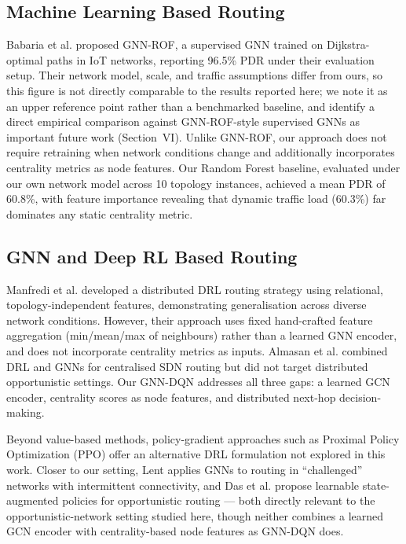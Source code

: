 \documentclass[conference]{IEEEtran}
\begin{document}
\subsection{Machine Learning Based Routing}
Babaria et al. \cite{babaria2025} proposed GNN-ROF, a supervised
GNN trained on Dijkstra-optimal paths in IoT networks, reporting
96.5\% PDR under their evaluation setup. Their network model,
scale, and traffic assumptions differ from ours, so this figure is
not directly comparable to the results reported here; we note it
as an upper reference point rather than a benchmarked baseline,
and identify a direct empirical comparison against GNN-ROF-style
supervised GNNs as important future work (Section~VI). Unlike
GNN-ROF, our approach does not require retraining when network
conditions change and additionally incorporates centrality metrics
as node features. Our Random Forest baseline, evaluated under our
own network model across 10 topology instances, achieved a mean
PDR of 60.8\%, with feature importance revealing that dynamic
traffic load (60.3\%) far dominates any static centrality metric.

\subsection{GNN and Deep RL Based Routing}
Manfredi et al. \cite{manfredi2021} developed a distributed DRL
routing strategy using relational, topology-independent features,
demonstrating generalisation across diverse network conditions.
However, their approach uses fixed hand-crafted feature aggregation
(min/mean/max of neighbours) rather than a learned GNN encoder,
and does not incorporate centrality metrics as inputs. Almasan
et al. \cite{almasan2020} combined DRL and GNNs for centralised
SDN routing but did not target distributed opportunistic settings.
Our GNN-DQN addresses all three gaps: a learned GCN encoder,
centrality scores as node features, and distributed next-hop
decision-making.

Beyond value-based methods, policy-gradient approaches such as
Proximal Policy Optimization (PPO) \cite{schulman2017} offer an
alternative DRL formulation not explored in this work. Closer to
our setting, Lent \cite{lent2022} applies GNNs to routing in
``challenged'' networks with intermittent connectivity, and Das
et al. \cite{das2025} propose learnable state-augmented policies
for opportunistic routing — both directly relevant to the
opportunistic-network setting studied here, though neither
combines a learned GCN encoder with centrality-based node features
as GNN-DQN does.
\end{document}
